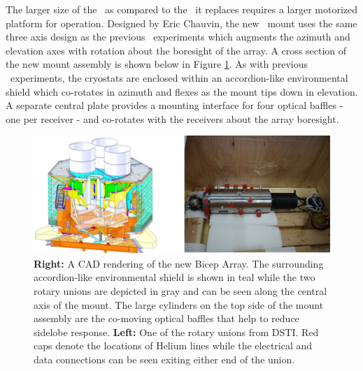 \documentclass[]{spie}  %
\begin{document}
The larger size of the \biceparray \ as compared to the \keckarray \ it replaces
requires a larger motorized platform for operation. Designed by Eric Chauvin,
the new \biceparray \ mount uses the same three axis design as the previous
\bk \ experiments which augments the azimuth and elevation axes with
rotation about the boresight of the array. A
cross section of the new mount assembly is shown below in Figure
\ref{fig:bamount}. As with previous \bk \ experiments, the cryostats
are enclosed within an accordion-like environmental shield which co-rotates in
azimuth and flexes as the mount tips down in elevation. A separate central
plate provides a mounting interface for four optical baffles - one per
receiver - and co-rotates with the receivers about the array boresight.


\begin{figure} [hb]
	\begin{center}
		\includegraphics[scale=0.65]{mount.png}
	\end{center}
	\caption{\textbf{Right:} A CAD rendering of the new Bicep Array. The surrounding
	accordion-like environmental shield is shown in teal while the two rotary
	unions are depicted in gray and can be seen along the central axis of the
	mount. The large cylinders on the top side of the mount assembly are the co-moving optical baffles that help to reduce sidelobe response. \textbf{Left:} One of the rotary unions from DSTI. Red caps
	denote the locations of Helium lines while the electrical and data connections
	can be seen exiting either end of the union.}
	\label{fig:bamount}
\end{figure}

\clearpage
\end{document}

